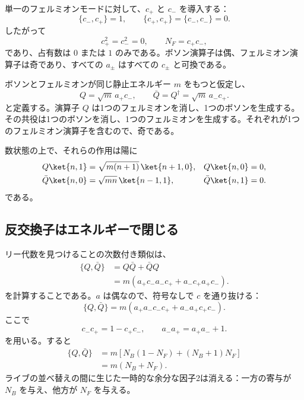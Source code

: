 単一のフェルミオンモードに対して、\(c_+\) と \(c_-\) を導入する：
\begin{equation}
\{c_-,c_+\}=1,
\qquad
\{c_+,c_+\}=\{c_-,c_-\}=0.
\end{equation}
したがって
\begin{equation}
c_+^2=c_-^2=0,
\qquad
N_F=c_+c_-,
\end{equation}
であり、占有数は \(0\) または \(1\) のみである。ボソン演算子は偶、フェルミオン演算子は奇であり、すべての \(a_\pm\) はすべての \(c_\pm\) と可換である。


ボソンとフェルミオンが同じ静止エネルギー \(m\) をもつと仮定し、
\begin{equation}
Q=\sqrt m\,a_+c_-,
\qquad
\bar Q=Q^\dagger=\sqrt m\,a_-c_+.
\end{equation}
と定義する。演算子 \(Q\) は1つのフェルミオンを消し、1つのボソンを生成する。その共役は1つのボソンを消し、1つのフェルミオンを生成する。それぞれが1つのフェルミオン演算子を含むので、奇である。

数状態の上で、それらの作用は陽に
\begin{align}
Q\ket{n,1}
&=\sqrt{m(n+1)}\,\ket{n+1,0},
&
Q\ket{n,0}&=0,\\
\bar Q\ket{n,0}
&=\sqrt{mn}\,\ket{n-1,1},
&
\bar Q\ket{n,1}&=0.
\end{align}
である。

\subsection{反交換子はエネルギーで閉じる}

リー代数を見つけることの次数付き類似は、
\begin{align}
\{Q,\bar Q\}
&=Q\bar Q+\bar Q Q\\
&=m\left(a_+c_-a_-c_+
        +a_-c_+a_+c_-\right).
\end{align}
を計算することである。\(a\) は偶なので、符号なしで \(c\) を通り抜ける：
\begin{equation}
\{Q,\bar Q\}
=m\left(a_+a_-c_-c_+
        +a_-a_+c_+c_-\right).
\end{equation}
ここで
\begin{equation}
c_-c_+=1-c_+c_-,
\qquad
a_-a_+=a_+a_-+1.
\end{equation}
を用いる。すると
\begin{align}
\{Q,\bar Q\}
&=m\left[
N_B(1-N_F)+(N_B+1)N_F
\right]\\
&=m(N_B+N_F).
\end{align}
ライブの並べ替えの間に生じた一時的な余分な因子2は消える：一方の寄与が \(N_B\) を与え、他方が \(N_F\) を与える。

